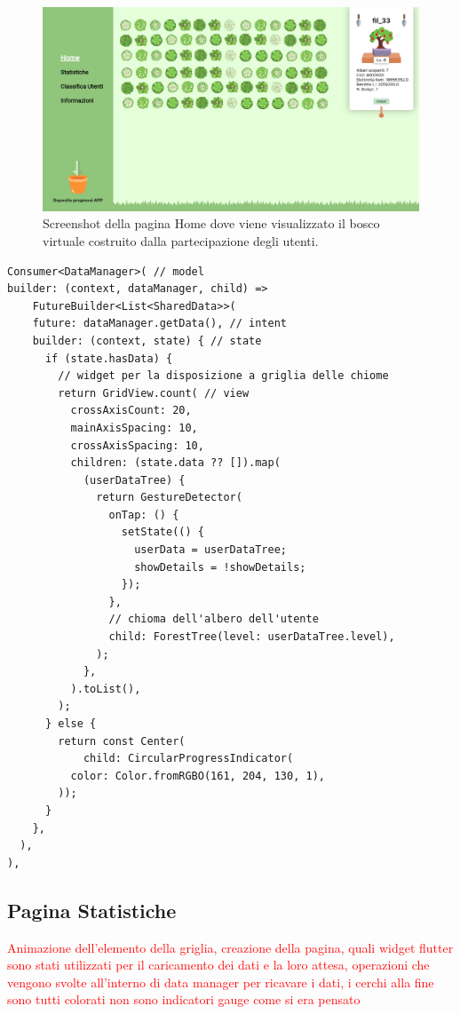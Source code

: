\begin{figure}[h]
  \centering
  \includegraphics[width=\textwidth]{img/totem/screenshot/homepage.png}
  \caption{Screenshot della pagina Home dove viene visualizzato il bosco virtuale costruito dalla partecipazione degli utenti.}
  \label{fig:homepage}
\end{figure}

\newpage
\begin{lstlisting}[style=FlutterStyle, caption={Parte del codice per la creazione del bosco della Homepage}, label={lst:homepageCode}]
Consumer<DataManager>( // model
builder: (context, dataManager, child) =>
    FutureBuilder<List<SharedData>>(
    future: dataManager.getData(), // intent
    builder: (context, state) { // state 
      if (state.hasData) {
        // widget per la disposizione a griglia delle chiome
        return GridView.count( // view
          crossAxisCount: 20,
          mainAxisSpacing: 10,
          crossAxisSpacing: 10,
          children: (state.data ?? []).map(
            (userDataTree) {
              return GestureDetector(
                onTap: () {
                  setState(() {
                    userData = userDataTree;
                    showDetails = !showDetails;
                  });
                },
                // chioma dell'albero dell'utente
                child: ForestTree(level: userDataTree.level),
              );
            },
          ).toList(),
        );
      } else {
        return const Center(
            child: CircularProgressIndicator(
          color: Color.fromRGBO(161, 204, 130, 1),
        ));
      }
    },
  ),
),
\end{lstlisting}
%
%
\subsection{Pagina Statistiche}
\textcolor{red}{Animazione dell'elemento della griglia, creazione della pagina, quali widget flutter sono stati utilizzati per il caricamento dei dati e la loro attesa, operazioni che vengono svolte all'interno di data manager per ricavare i dati, i cerchi alla fine sono tutti colorati non sono indicatori gauge come si era pensato}

